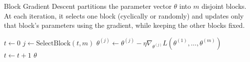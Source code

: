   \begin{algo}
    Block Gradient Descent partitions the parameter vector $\theta$ into $m$ disjoint blocks. At each iteration, it selects one block (cyclically or randomly) and updates only that block’s parameters using the gradient, while keeping the other blocks fixed. 
    \begin{algorithm}[H]
    \label{alg:block_gd}
    \begin{algorithmic}[1]  %

        \State $t \gets 0$
          \State $j \gets \text{SelectBlock}(t, m)$ 
          \State $\theta^{(j)} \gets \theta^{(j)} - \eta \nabla_{\theta^{(j)}} L(\theta^{(1)}, \dots, \theta^{(m)})$
          \State $t \gets t + 1$
        \EndWhile
        \State \Return $\theta$
      \EndProcedure
    \end{algorithmic}
    \end{algorithm}
  \end{algo}

